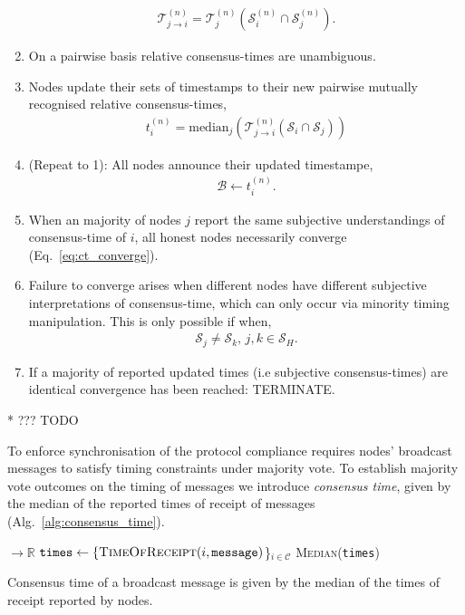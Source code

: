 \begin{enumerate}
	      \begin{align}
		      \mathcal{T}_{j\to i}^{(n)} = \mathcal{T}_j^{(n)}(\mathcal{S}_i^{(n)} \cap \mathcal{S}_j^{(n)}).
	      \end{align}
	\item On a pairwise basis relative consensus-times are unambiguous.
	\item Nodes update their sets of timestamps to their new pairwise mutually recognised relative consensus-times,
	      \begin{align}
		      t_i^{(n)} = \mathrm{median}_j(\mathcal{T}_{j\to i}^{(n)}(\mathcal{S}_i \cap \mathcal{S}_j))
	      \end{align}
	\item (Repeat to 1): All nodes announce their updated timestampe,
	      \begin{align}
		      \mathcal{B} \gets t_i^{(n)}.
	      \end{align}
	\item When an majority of nodes $j$ report the same subjective understandings of consensus-time of $i$, all honest nodes necessarily converge (Eq.~\eqref{eq:ct_converge}).
	\item Failure to converge arises when different nodes have different subjective interpretations of consensus-time, which can only occur via minority timing manipulation. This is only possible if when,
	      \begin{align}
		      \mathcal{S}_j\neq \mathcal{S}_k, \, j,k\in \mathcal{S}_H.
	      \end{align}
	\item If a majority of reported updated times (i.e subjective consensus-times) are identical convergence has been reached: TERMINATE.
\end{enumerate}

* ??? TODO

To enforce synchronisation of the protocol compliance requires nodes' broadcast messages to satisfy timing constraints under majority vote. To establish majority vote outcomes on the timing of messages we introduce \emph{consensus time}, given by the median of the reported times of receipt of messages (Alg.~\ref{alg:consensus_time}).

\begin{algorithm}[H]
	\begin{algorithmic}
		 $\to \mathbb{R}$
		\State $\texttt{times} \gets \{\textsc{TimeOfReceipt}(i,\texttt{message})$\}$_{i\in\mathcal{C}}$
		\State \Return \textsc{Median}(\texttt{times})
		\EndFunction
	\end{algorithmic}
	\caption{Consensus time of a broadcast message is given by the median of the times of receipt reported by nodes.} \label{alg:consensus_time}
\end{algorithm}

